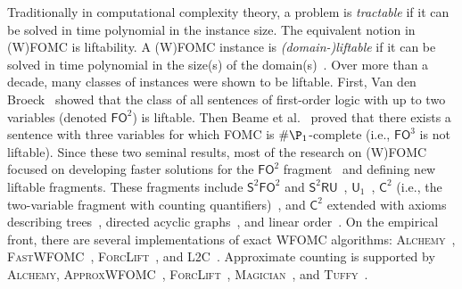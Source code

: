 \documentclass{article}
\theoremstyle{definition}
\theoremstyle{remark}
\newcommand{\FOtwo}{$\mathsf{FO}^{2}$}
\newcommand{\FOthree}{$\mathsf{FO}^{3}$}
\newcommand{\SFO}{$\mathsf{S}^{2}\mathsf{FO}^{2}$}
\newcommand{\SRU}{$\mathsf{S}^{2}\mathsf{RU}$}
\newcommand{\Uone}{$\mathsf{U}_{1}$}
\newcommand{\Ctwo}{$\mathsf{C}^{2}$}
\begin{document}
Traditionally in computational complexity theory, a problem is \emph{tractable}
if it can be solved in time polynomial in the instance size. The equivalent
notion in (W)FOMC is liftability. A (W)FOMC instance is \emph{(domain-)liftable}
if it can be solved in time polynomial in the size(s) of the
domain(s)~\cite{DBLP:conf/starai/JaegerB12}. Over more than a decade, many
classes of instances were shown to be liftable. First, Van den
Broeck~ showed that the class of all
sentences of first-order logic with up to two variables (denoted \FOtwo{}) is
liftable. Then Beame et al.~ proved that
there exists a sentence with three variables for which FOMC is
$\#\P_{1}$-complete (i.e., \FOthree{} is not liftable). Since these two seminal
results, most of the research on (W)FOMC focused on developing faster solutions
for the \FOtwo{}
fragment~\cite{DBLP:conf/uai/BremenK21,DBLP:conf/aaai/MalhotraS22} and defining
new liftable fragments. These fragments include \SFO{} and
\SRU{}~\cite{DBLP:conf/nips/KazemiKBP16},
\Uone{}~\cite{DBLP:conf/lics/KuusistoL18}, \Ctwo{} (i.e., the two-variable
fragment with counting
quantifiers)~\cite{DBLP:journals/jair/Kuzelka21,DBLP:conf/aaai/MalhotraS22}, and
\Ctwo{} extended with axioms describing trees~\cite{DBLP:conf/kr/BremenK21},
directed acyclic graphs~\cite{DBLP:journals/corr/abs-2302-09830}, and linear
order~\cite{DBLP:journals/corr/abs-2211-01164}. On the empirical front, there
are several implementations of exact WFOMC algorithms:
\textsc{Alchemy}~\cite{DBLP:journals/cacm/GogateD16},
\textsc{FastWFOMC}~\cite{DBLP:conf/uai/BremenK21},
\textsc{ForcLift}~\cite{DBLP:conf/ijcai/BroeckTMDR11}, and
\textsc{L2C}~\cite{DBLP:conf/kr/KazemiP16}. Approximate counting is supported by
\textsc{Alchemy}, \textsc{ApproxWFOMC}~\cite{DBLP:conf/ijcai/BremenK20},
\textsc{ForcLift}~\cite{DBLP:conf/uai/BroeckCD12},
\textsc{Magician}~\cite{DBLP:conf/aaai/VenugopalSG15}, and
\textsc{Tuffy}~\cite{DBLP:journals/pvldb/NiuRDS11}.


\end{document}
